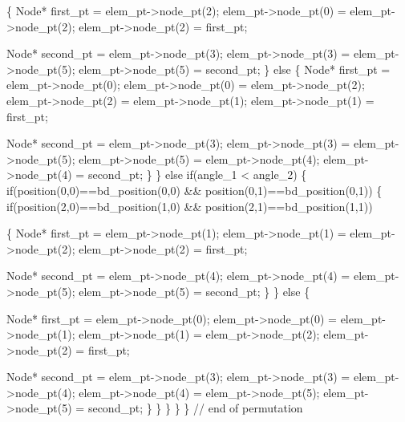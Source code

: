 \begin{DoxyCodeInclude}
          \{
           Node* first\_pt = elem\_pt->node\_pt(2);
           elem\_pt->node\_pt(0) = elem\_pt->node\_pt(2);
           elem\_pt->node\_pt(2) = first\_pt;
           
           Node* second\_pt = elem\_pt->node\_pt(3);
           elem\_pt->node\_pt(3) = elem\_pt->node\_pt(5);
           elem\_pt->node\_pt(5) = second\_pt;                         
          \}
         \textcolor{keywordflow}{else} 
          \{ 
           Node* first\_pt = elem\_pt->node\_pt(0);
           elem\_pt->node\_pt(0) = elem\_pt->node\_pt(2);
           elem\_pt->node\_pt(2) = elem\_pt->node\_pt(1);
           elem\_pt->node\_pt(1) = first\_pt;
           
           Node* second\_pt = elem\_pt->node\_pt(3);
           elem\_pt->node\_pt(3) = elem\_pt->node\_pt(5);
           elem\_pt->node\_pt(5) = elem\_pt->node\_pt(4);
           elem\_pt->node\_pt(4) = second\_pt;
          \}
        \}
       \textcolor{keywordflow}{else} \textcolor{keywordflow}{if}(angle\_1 < angle\_2)
        \{
         \textcolor{keywordflow}{if}(position(0,0)==bd\_position(0,0) && position(0,1)==bd\_position(0,1))
          \{
           \textcolor{keywordflow}{if}(position(2,0)==bd\_position(1,0) && position(2,1)==bd\_position(1,1))                          
              
            \{
             Node* first\_pt = elem\_pt->node\_pt(1);
             elem\_pt->node\_pt(1) = elem\_pt->node\_pt(2);
             elem\_pt->node\_pt(2) = first\_pt;
             
             Node* second\_pt = elem\_pt->node\_pt(4);
             elem\_pt->node\_pt(4) = elem\_pt->node\_pt(5);
             elem\_pt->node\_pt(5) = second\_pt;                         
            \}
          \}
         \textcolor{keywordflow}{else} 
          \{
           
           Node* first\_pt = elem\_pt->node\_pt(0);
           elem\_pt->node\_pt(0) = elem\_pt->node\_pt(1);
           elem\_pt->node\_pt(1) = elem\_pt->node\_pt(2);
           elem\_pt->node\_pt(2) = first\_pt;
           
           Node* second\_pt = elem\_pt->node\_pt(3);
           elem\_pt->node\_pt(3) = elem\_pt->node\_pt(4);
           elem\_pt->node\_pt(4) = elem\_pt->node\_pt(5);
           elem\_pt->node\_pt(5) = second\_pt;
          \}   
        \}
      \}
    \}
  \}  \textcolor{comment}{// end of permutation}

\end{DoxyCodeInclude}




